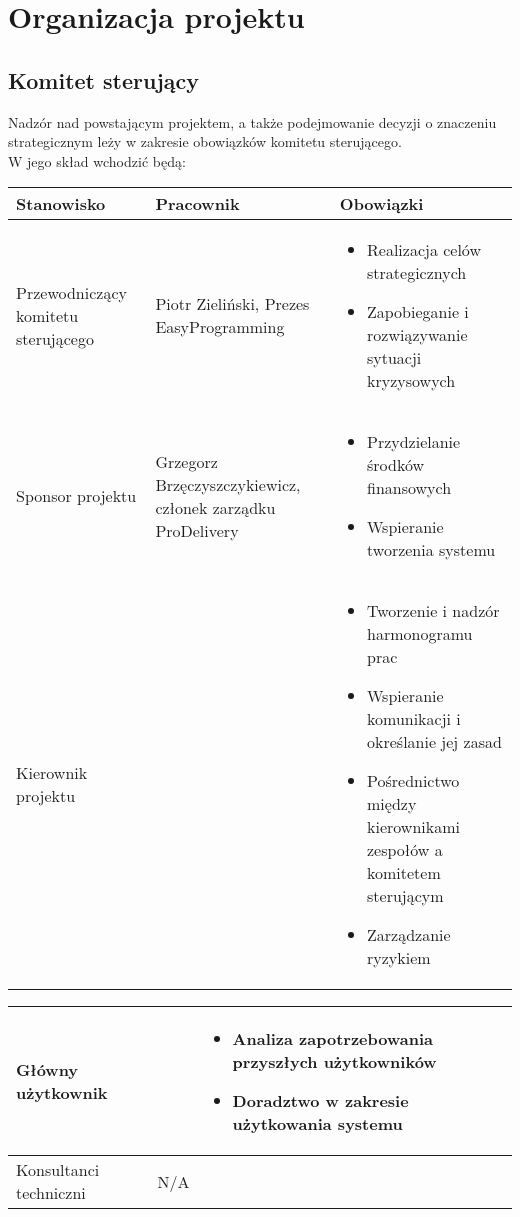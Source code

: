 \documentclass[12pt]{article}
\begin{document}
\newpage
\section{Organizacja projektu}
\subsection{Komitet sterujący}
Nadzór nad powstającym projektem, a także podejmowanie decyzji o znaczeniu strategicznym leży w zakresie obowiązków komitetu sterującego.\\
W jego skład wchodzić będą:\\

\begin{tabular}{|p{4.5cm}|p{4.5cm}|p{4.5cm}|} \hline
Stanowisko & Pracownik & Obowiązki \\
\hline \hline
Przewodniczący komitetu sterującego & Piotr Zieliński, Prezes EasyProgramming & 
\begin{itemize}
\item Realizacja celów strategicznych
\item Zapobieganie i rozwiązywanie sytuacji kryzysowych
\end{itemize}\\
\hline
Sponsor projektu & Grzegorz Brzęczyszczykiewicz, członek zarządku ProDelivery &
\begin{itemize}
\item Przydzielanie środków finansowych
\item Wspieranie tworzenia systemu
\end{itemize}\\
\hline
Kierownik projektu & & 
\begin{itemize}
\item Tworzenie i nadzór harmonogramu prac
\item Wspieranie komunikacji i określanie jej zasad 
\item Pośrednictwo między kierownikami zespołów a komitetem sterującym
\item Zarządzanie ryzykiem
\end{itemize}\\
 \hline
\end{tabular}
\newpage
\begin{tabular}{|p{4.5cm}|p{4.5cm}|p{4.5cm}|} \hline
Główny użytkownik & & 
\begin{itemize}
\item Analiza zapotrzebowania przyszłych użytkowników
\item Doradztwo w zakresie użytkowania systemu
\end{itemize}\\
 \hline
Konsultanci techniczni & N/A & \\
 \hline
\end{tabular}
\end{document}
